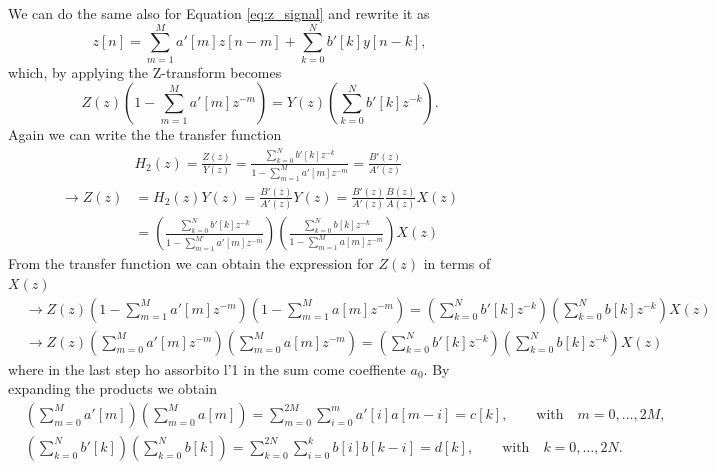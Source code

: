 We can do the same also for Equation \ref{eq:z_signal} and rewrite it as 
\begin{equation}\label{eq:z_signal1}
    z[n] = \sum_{m=1}^{M} a'[m]z[n-m] + \sum_{k=0}^{N} b'[k] y[n-k],
\end{equation}
which, by applying the Z-transform becomes
\begin{equation}\label{eq:z_signal_transform}
    Z(z)\left(1 - \sum_{m=1}^{M} a'[m] z^{-m} \right) = Y(z) \left( \sum_{k=0}^{N} b'[k] z^{-k} \right).
\end{equation}
Again we can write the the transfer function
\begin{align}
    &H_2(z) = \frac{Z(z)}{Y(z)} = \frac{\sum_{k=0}^{N} b'[k] z^{-k}}{1 - \sum_{m=1}^{M} a'[m] z^{-m}} = \frac{B'(z)}{A'(z)} \\
    \rightarrow Z(z) &= H_2(z)Y(z) = \frac{B'(z)}{A'(z)}Y(z) = \frac{B'(z)}{A'(z)} \frac{B(z)}{A(z)} X(z)\\ \label{eq:transfer2}
    &= \left( \frac{\sum_{k=0}^{N} b'[k] z^{-k}}{1 - \sum_{m=1}^{M'} a'[m] z^{-m}} \right) \left( \frac{\sum_{k=0}^{N} b[k] z^{-k}}{1 - \sum_{m=1}^{M} a[m] z^{-m}} \right) X(z)
\end{align}
From the transfer function we can obtain the expression for $Z(z)$ in terms of $X(z)$ 
\begin{align}
    & \rightarrow Z(z) \left(1 - \sum_{m=1}^{M} a'[m] z^{-m} \right) \left(1 - \sum_{m=1}^{M} a[m] z^{-m} \right) = \left( \sum_{k=0}^{N} b'[k] z^{-k} \right) \left( \sum_{k=0}^{N} b[k] z^{-k} \right) X(z) \\
    & \rightarrow Z(z) \left( \sum_{m=0}^{M} a'[m] z^{-m} \right) \left( \sum_{m=0}^{M} a[m] z^{-m} \right) = \left( \sum_{k=0}^{N} b'[k] z^{-k} \right) \left( \sum_{k=0}^{N} b[k] z^{-k} \right) X(z) \label{eq:Zz}
\end{align}
where in the last step  ho assorbito l'1 in the sum come coeffiente $a_0$. By expanding the products we obtain
\begin{align}
    & \left( \sum_{m=0}^{M} a'[m] \right) \left( \sum_{m=0}^{M} a[m] \right) = \sum_{m=0}^{2M}\sum_{i=0}^{m} a'[i] a[m - i] = c[k], \quad\quad \text{with}\quad m = 0, \dots, 2M, \label{eq:ck} \\
    & \left( \sum_{k=0}^{N} b'[k] \right) \left( \sum_{k=0}^{N} b[k] \right) = \sum_{k=0}^{2N} \sum_{i=0}^{k} b[i] b[k-i] = d[k], \quad\quad \text{with}\quad k = 0, \dots, 2N. \label{eq:dk}
\end{align}

